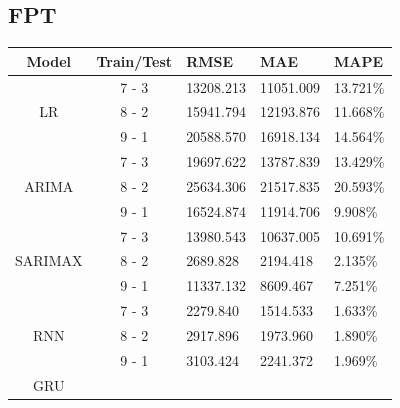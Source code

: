 \documentclass{ieeeojies}
\begin{document}
\subsection{FPT}
\begin{table}[H]
    \renewcommand{\arraystretch}{1.5}
    \centering
    \begin{tabular}{|c|c|p{1.2cm}|p{1.2cm}|p{1cm}|}
        \hline
        \textbf{Model} & \textbf{Train/Test} & \textbf{RMSE} & \textbf{MAE} & \textbf{MAPE} \\
        \hline
        \multirow{3}{*}{LR}
                       & 7 - 3               & 13208.213     & 11051.009    & 13.721\%      \\
        \cline{2-5}
                       & 8 - 2               & 15941.794     & 12193.876    & 11.668\%      \\
        \cline{2-5}
                       & 9 - 1               & 20588.570     & 16918.134    & 14.564\%      \\
        \hline
        \multirow{3}{*}{ARIMA}
                       & 7 - 3               & 19697.622     & 13787.839    & 13.429\%      \\
        \cline{2-5}
                       & 8 - 2               & 25634.306     & 21517.835    & 20.593\%      \\
        \cline{2-5}
                       & 9 - 1               & 16524.874     & 11914.706    & 9.908\%       \\
        \hline
        \multirow{3}{*}{SARIMAX}
                       & 7 - 3               & 13980.543     & 10637.005    & 10.691\%      \\
        \cline{2-5}
                       & 8 - 2               & 2689.828      & 2194.418     & 2.135\%       \\
        \cline{2-5}
                       & 9 - 1               & 11337.132     & 8609.467     & 7.251\%       \\
        \hline
        \multirow{3}{*}{RNN}
                       & 7 - 3               & 2279.840      & 1514.533     & 1.633\%       \\
        \cline{2-5}
                       & 8 - 2               & 2917.896      & 1973.960     & 1.890\%       \\
        \cline{2-5}
                       & 9 - 1               & 3103.424      & 2241.372     & 1.969\%       \\
        \hline
        \multirow{3}{*}{GRU}

\end{tabular}
\end{table}
\end{document}
